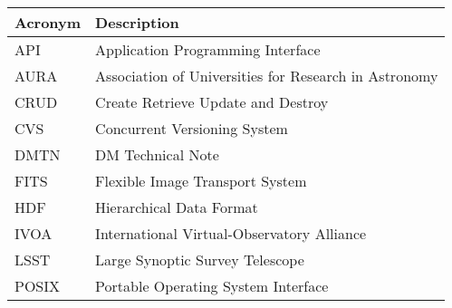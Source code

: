 \addtocounter{table}{-1}
\begin{longtable}{|l|p{}|}\hline
\textbf{Acronym} & \textbf{Description}  \\\hline

API & Application Programming Interface \\\hline
AURA & Association of Universities for Research in Astronomy \\\hline
CRUD & Create Retrieve Update and Destroy \\\hline
CVS & Concurrent Versioning System \\\hline
DMTN & DM Technical Note \\\hline
FITS & Flexible Image Transport System \\\hline
HDF & Hierarchical Data Format \\\hline
IVOA & International Virtual-Observatory Alliance \\\hline
LSST & Large Synoptic Survey Telescope \\\hline
POSIX & Portable Operating System Interface \\\hline
\end{longtable}

